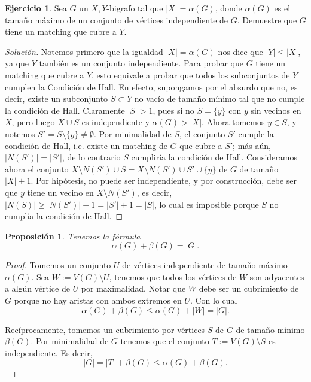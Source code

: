 \documentclass[12pt]{report}
\theoremstyle{plain}
\newtheorem{proposition}[theorem]{Proposición}
\theoremstyle{definition}
\newtheorem{exercise}[theorem]{Ejercicio}
\newenvironment{solution}{\begin{proof}[Solución]}{\end{proof}}
\newcommand{\abs}[1]{\left \vert #1 \right \vert}
\begin{document}
\begin{exercise}
Sea $G$ un $X,Y$-bigrafo tal que $\abs X = \alpha (G)$, donde $\alpha (G)$ es el tamaño máximo de un conjunto de vértices independiente de $G$. Demuestre que $G$ tiene un matching que cubre a $Y$.
\end{exercise}
\begin{solution}
Notemos primero que la igualdad $\abs X = \alpha (G)$ nos dice que $\abs Y \leq \abs X$, ya que $Y$ también es un conjunto independiente. Para probar que $G$ tiene un matching que cubre a $Y$, esto equivale a probar que todos los subconjuntos de $Y$ cumplen la Condición de Hall. En efecto, supongamos por el absurdo que no, es decir, existe un subconjunto $S \subset Y$ no vacío de tamaño mínimo tal que no cumple la condición de Hall. Claramente $\abs S > 1$, pues si no $S = \{y\}$ con  $y$ sin vecinos en $X$, pero luego $X \cup S$ es independiente y $\alpha (G) > \abs X$. Ahora tomemos $y \in S$, y notemos $S' = S \setminus \{y \} \neq \emptyset$. Por minimalidad de $S$, el conjunto $S'$ cumple la condición de Hall, i.e. existe un matching de $G$ que cubre a $S'$; más aún, $\abs {N(S')} = \abs {S'} $, de lo contrario $S$ cumpliría la condición de Hall. Consideramos ahora el conjunto $X \setminus N(S') \cup S = X \setminus N(S') \cup S' \cup \{y\}$ de $G$ de tamaño $\abs X +1$. Por hipótesis, no puede ser independiente, y por construcción, debe ser que $y$ tiene un vecino en $X \setminus N(S')$, es decir, $\abs {N (S)} \geq \abs{N(S')} + 1 = \abs {S'} + 1 = \abs S$, lo cual es imposible porque $S$ no cumplía la condición de Hall.
\end{solution}








\begin{proposition}
Tenemos la fórmula
\[
\boxed{\alpha (G) + \beta (G) = \abs G.}
\]
\end{proposition}
\begin{proof}
Tomemos un conjunto $U$ de vértices independiente de tamaño máximo $\alpha (G)$. Sea $W := V(G) \setminus U$, tenemos que todos los vértices de $W$ son adyacentes a algún vértice de $U$ por maximalidad. Notar que $W$ debe ser un cubrimiento de $G$ porque no hay aristas con ambos extremos en $U$. Con lo cual
\[
\alpha (G) + \beta (G) \leq \alpha (G) + \abs W = \abs G.
\]

Recíprocamente, tomemos un cubrimiento por vértices $S$ de $G$ de tamaño mínimo $\beta (G)$. Por minimalidad de $G$ tenemos que el conjunto $T := V(G) \setminus S$ es independiente. Es decir,
\[
\abs G = \abs T + \beta (G) \leq \alpha (G) + \beta (G).
\]
\end{proof}
\end{document}
